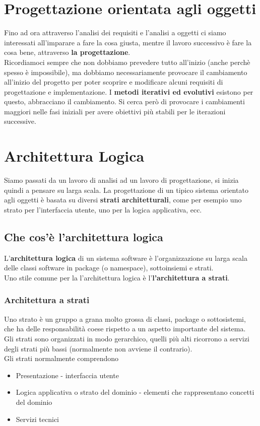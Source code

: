 \chapter{Progettazione orientata agli oggetti}
Fino ad ora attraverso l'analisi dei requisiti e l'analisi a oggetti ci siamo
interessati all'imparare a fare la cosa giusta, mentre il lavoro successivo
è fare la cosa bene, attraverso \textbf{la progettazione}.
\\ Ricordiamoci sempre che non dobbiamo prevedere tutto all'inizio (anche perchè
spesso è impossibile), ma dobbiamo necessariamente provocare il cambiamento
all'inizio del progetto per poter scoprire e modificare alcuni requisiti di progettazione
e implementazione. I \textbf{metodi iterativi ed evolutivi} esistono per questo,
abbracciano il cambiamento. Si cerca però di provocare i cambiamenti maggiori nelle
fasi iniziali per avere obiettivi più stabili per le iterazioni successive.
\chapter{Architettura Logica}
Siamo passati da un lavoro di analisi ad un lavoro di progettazione, si inizia
quindi a pensare su larga scala. La progettazione di un tipico sistema
orientato agli oggetti è basata su diversi \textbf{strati architetturali},
come per esempio uno strato per l'interfaccia utente, uno per la logica applicativa, ecc.
\section{Che cos'è l'architettura logica}
L'\textbf{architettura logica} di un sistema software è l'organizzazione su larga scala
delle classi software in package (o namespace), sottoinsiemi e strati.
\\ Uno stile comune per la l'architettura logica è l'\textbf{l'architettura a strati}.
\subsection{Architettura a strati}
Uno strato è un gruppo a grana molto grossa di classi, package o sottosistemi, che ha
delle responsabilità coese rispetto a un aspetto importante del sistema.
\\ Gli strati sono organizzati in modo gerarchico, quelli più alti ricorrono a 
servizi degli strati più bassi (normalmente non avviene il contrario).
\\ Gli strati normalmente comprendono
\begin{itemize}
    \item Presentazione - interfaccia utente
    \item Logica applicativa o strato del dominio - elementi che rappresentano concetti
    del dominio
    \item Servizi tecnici
\end{itemize}
